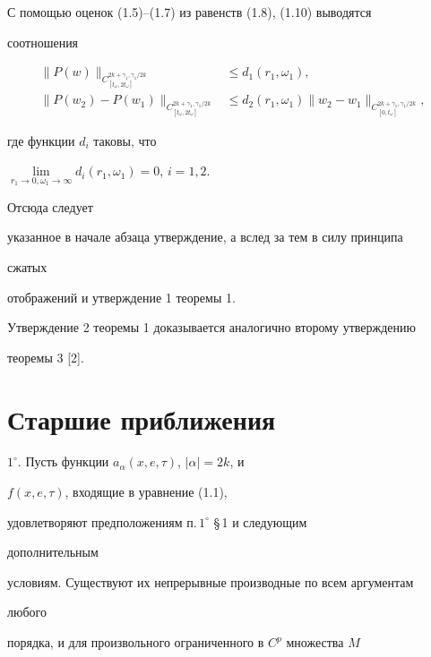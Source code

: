 С помощью оценок (1.5)--(1.7) из равенств (1.8), (1.10) выводятся 


соотношения 


\begin{align*} 


\|P(w)\|_{C^{2k+\gamma_1,\gamma_1/2k}_{[t_\omega,2t_\omega]}}&\le 


d_1(r_1,\omega_1),\\ 


% 


\|P(w_2)-P(w_1) 


\|_{C^{2k+\gamma_1,\gamma_1/2k}_{[t_\omega,2t_\omega]}}&\le 


d_2(r_1,\omega_1) 


\|w_2-w_1\|_{C^{2k+\gamma_1,\gamma_1/2k}_{[0,t_\omega]}}, 


\end{align*} 


где функции $d_i$ таковы, что 


$\lim\limits_{r_1\to0,\omega_1\to\infty}d_i(r_1,\omega_1)=0$, $i=1,2$. 


Отсюда следует 


указанное в начале абзаца утверждение, а вслед за тем в силу принципа 


сжатых 


отображений и утверждение 1 теоремы 1. 


 


Утверждение 2 теоремы 1 доказывается аналогично второму утверждению 


теоремы 3 [2]. 


 


\section{Старшие приближения} 


 


$1^\circ$. Пусть функции $a_\alpha(x,e,\tau)$, $|\alpha|=2k$, и 


$f(x,e,\tau)$, входящие в уравнение (1.1), 


удовлетворяют предположениям п.\,$1^\circ$ \S\,1 и следующим 


дополнительным 


условиям. Существуют их непрерывные производные по всем аргументам 


любого 


порядка, и для произвольного ограниченного в $C^p$ множества $M$ 


